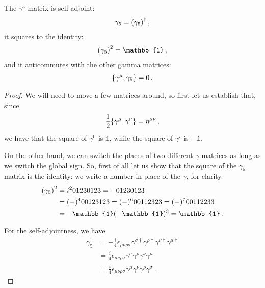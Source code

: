 \documentclass[main.tex]{subfiles}
\begin{document}
\begin{claim}
The \(\gamma^{5}\) matrix is self adjoint: 
%
\begin{align}
\gamma_{5} = \qty(\gamma_{5})^\dag
\,,
\end{align}
%
it squares to the identity: 
%
\begin{align}
\qty(\gamma_5 )^2 = \mathbb{1}
\,,
\end{align}
%
and it anticommutes with the other gamma matrices: 
%
\begin{align}
\qty{\gamma^{\mu } , \gamma_5 } = 0
\,.
\end{align}
\end{claim}

\begin{proof}
We will need to move a few matrices around, so first let us establish that, since 
%
\begin{align}
\frac{1}{2} \qty{\gamma^{\mu }, \gamma^{\nu }} = \eta^{\mu \nu }
\,,
\end{align}
%
we have that the square of \(\gamma^{0} \) is \(\mathbb{1}\), while the square of \(\gamma^{i} \) is \(- \mathbb{1}\). 

On the other hand, we can switch the places of two different \(\gamma \) matrices as long as we switch the global sign. So, first of all let us show that the square of the \(\gamma_5 \) matrix is the identity: we write a number in place of the \(\gamma \), for clarity.  
%
\begin{subequations}
\begin{align}
\qty(\gamma_{5})^2 &= i^2 01230123 = - 01230123  \\
&= (-)^{4} 00123123 = (-)^{6} 00112323 = (-)^{7} 00112233  \\
&= - \mathbb{1} (-\mathbb{1})^3 = \mathbb{1}
\,.
\end{align}
\end{subequations}

For the self-adjointness, we have 
%
\begin{subequations}
\begin{align}
\gamma_5 ^\dag &= + \frac{i}{4} \epsilon_{\mu \nu \rho \sigma } 
\gamma^{\sigma \dag} \gamma^{\rho \dag} \gamma^{\nu \dag} \gamma^{\mu \dag} \\
&= \frac{i}{4} \epsilon_{\mu \nu \rho \sigma } \gamma^{\sigma } \gamma^{\rho } \gamma^{\nu } \gamma^{\mu }  \\
&= \frac{i}{4} \epsilon_{\mu \nu \rho \sigma }
\gamma^{\mu } \gamma^{\nu } \gamma^{\rho } \gamma^{\sigma }
\,.
\end{align}
\end{subequations}


\end{proof}
\end{document}
